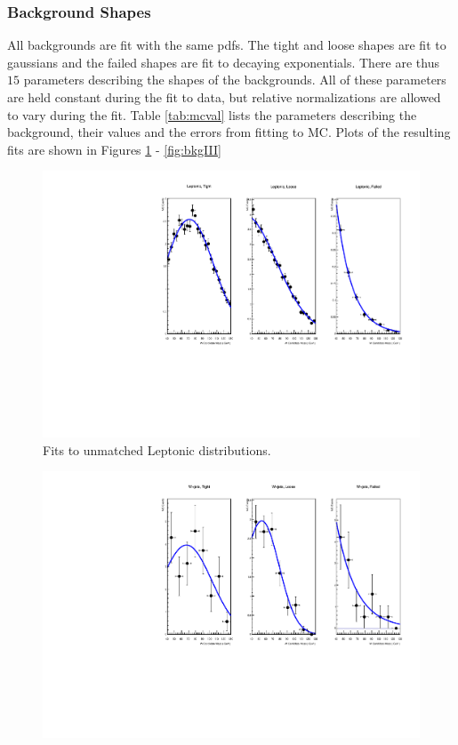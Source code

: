 \begin{}[h!]
\subsubsection{Background Shapes}
All backgrounds are fit with the same pdfs. The tight and loose shapes are fit to gaussians and the failed shapes are fit to decaying exponentials. There are thus $15$ parameters describing the shapes of the backgrounds. All of these parameters are held constant during the fit to data, but relative normalizations are allowed to vary during the fit. Table \ref{tab:mcval} lists the parameters describing the background, their values and the errors from fitting to MC. Plots of the resulting fits are shown in Figures \ref{fig:bkgI} - \ref{fig:bkgIII}
\begin{figure}[h!]
\centering
\includegraphics[scale=0.87]{figs/WtagSF/Leptonic_fits.pdf}
\caption{Fits to unmatched Leptonic distributions.}\label{fig:bkgI}
\end{figure}
\begin{figure}[h!]
\centering
\includegraphics[scale=0.87]{figs/WtagSF/Wjets_fits.pdf}

\end{figure}
\end{}
